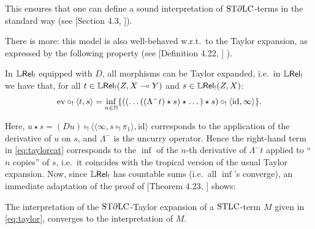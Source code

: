 This ensures that one can define a sound interpretation of $\mathrm{ST}\partial\mathrm{LC}$-terms in the standard way (see [Section 4.3, \cite{Manzo2010}]).

There is more: this model is also well-behaved w.r.t.\ to the Taylor expansion, as expressed by the following property (see [Definition 4.22, \cite{Manzo2012}]%
).

\begin{theorem}\label{thm:modelsTaylor}
 In $\mathbb{L} \mathsf{Rel}_!$ equipped with $D$, all morphisms can be Taylor expanded, i.e.\ in $\mathbb{L} \mathsf{Rel}_!$ we have that, for all
$t\in{\mathbb{L}\mathsf{Rel}_!}(Z,X\multimap Y)$ and $s\in{\mathbb{L}\mathsf{Rel}_!}(Z,X)$:%
 \begin{align}\label{eq:taylorcat}
  \RM{ev}\circ_!\langle t,s\rangle =
  \inf\limits_{n\in\N}
  \set{((\dots((\Lambda^- t)\star s)\star \dots)\star s)\circ_! \langle \RM{id},\infty \rangle}.
 \end{align}
 \end{theorem}
Here,
$u\star s= (Du)\circ_{!} \langle \langle  \infty, s\circ_{!} \pi_{1}\rangle,\mathrm{id}\rangle$ corresponds to the application of the derivative of $u$ on $s$, and $\Lambda^-$ is the uncurry operator.
Hence the right-hand term in \eqref{eq:taylorcat} corresponds to the $\inf$ of the $n$-th derivative of $\Lambda^{-}t$ applied to ``$n$ copies'' of $s$,  i.e.~it coincides with the tropical %
version of the usual Taylor expansion.
Now, since $\mathbb{L} \mathsf{Rel}_!$ has countable sums (i.e.~all $\inf$'s converge), an immediate adaptation of the proof of [Theorem 4.23, \cite{Manzo2012}] shows:

\begin{corollary}\label{cor:T(M)=M}
 The interpretation of the $\mathrm{ST}\partial\mathrm{LC}$-Taylor expansion of a $\mathrm{STLC}$-term $M$ given in \eqref{eq:taylor}, converges to the interpretation of $M$.
\end{corollary}


